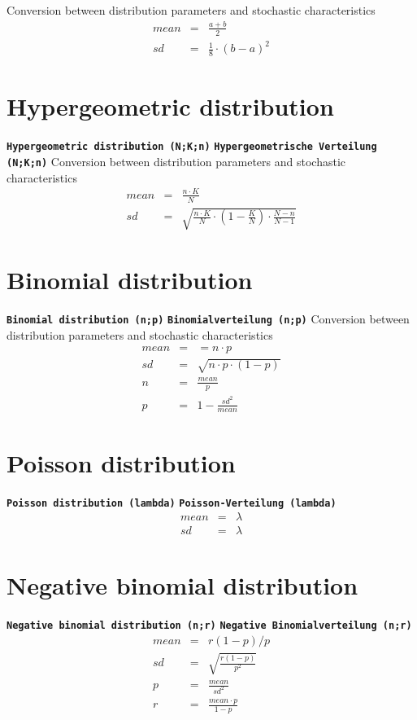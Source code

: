 \documentclass{svmono}
\def\cm#1{\textbf{\texttt{#1}}}
\begin{document}
Conversion between distribution parameters and stochastic characteristics
\begin{eqnarray*}
mean&=&\frac{a+b}{2}\\
sd&=&\frac{1}{8}\cdot(b-a)^2
\end{eqnarray*}





\section*{Hypergeometric distribution}
\cm{Hypergeometric distribution (N;K;n)}
\cm{Hypergeometrische Verteilung (N;K;n)}
Conversion between distribution parameters and stochastic characteristics
\begin{eqnarray*}
mean&=&\frac{n\cdot K}{N}\\
sd&=&\sqrt{\frac{n\cdot K}{N}\cdot\left(1-\frac{K}{N}\right)\cdot\frac{N-n}{N-1}}
\end{eqnarray*}





\section*{Binomial distribution}
\cm{Binomial distribution (n;p)}
\cm{Binomialverteilung (n;p)}
Conversion between distribution parameters and stochastic characteristics
\begin{eqnarray*}
mean&=&=n\cdot p\\
sd&=&\sqrt{n\cdot p\cdot (1-p)}\\
n&=&\frac{mean}{p}\\
p&=&1-\frac{sd^2}{mean}
\end{eqnarray*}





\section*{Poisson distribution}
\cm{Poisson distribution (lambda)}
\cm{Poisson-Verteilung (lambda)}
\begin{eqnarray*}
mean&=&\lambda\\
sd&=&\lambda
\end{eqnarray*}





\section*{Negative binomial distribution}
\cm{Negative binomial distribution (n;r)}
\cm{Negative Binomialverteilung (n;r)}
\begin{eqnarray*}
mean&=&r(1-p)/p\\
sd&=&\sqrt{\frac{r(1-p)}{p^2}}\\
p&=&\frac{mean}{sd^2}\\
r&=&\frac{mean\cdot p}{1-p}
\end{eqnarray*}
\end{document}
